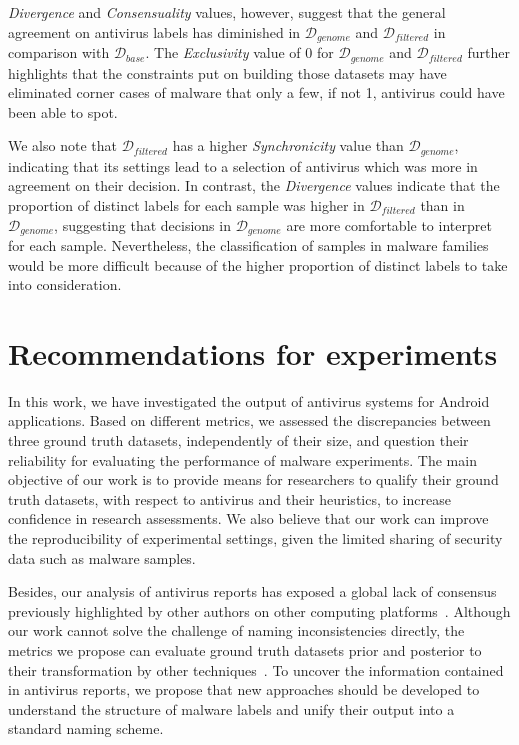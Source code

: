 \emph{Divergence} and \emph{Consensuality} values, however, suggest that the general agreement on antivirus labels has diminished in $\mathcal{D}_{genome}$ and $\mathcal{D}_{filtered}$ in comparison with $\mathcal{D}_{base}$.
The \emph{Exclusivity} value of 0 for $\mathcal{D}_{genome}$ and $\mathcal{D}_{filtered}$ further highlights that the constraints put on building those datasets may have eliminated corner cases of malware that only a few, if not 1, antivirus could have been able to spot.

We also note that $\mathcal{D}_{filtered}$ has a higher \emph{Synchronicity} value than $\mathcal{D}_{genome}$, indicating that its settings lead to a selection of antivirus which was more in agreement on their decision.
In contrast, the \emph{Divergence} values indicate that the proportion of distinct labels for each sample was higher in $\mathcal{D}_{filtered}$ than in $\mathcal{D}_{genome}$, suggesting that decisions in $\mathcal{D}_{genome}$ are more comfortable to interpret for each sample.
Nevertheless, the classification of samples in malware families would be more difficult because of the higher proportion of distinct labels to take into consideration.
\section{Recommendations for experiments}
In this work, we have investigated the output of antivirus systems for Android applications.
Based on different metrics, we assessed the discrepancies between three ground truth datasets, independently of their size, and question their reliability for evaluating the performance of malware experiments.
The main objective of our work is to provide means for researchers to qualify their ground truth datasets, with respect to antivirus and their heuristics, to increase confidence in research assessments.
We also believe that our work can improve the reproducibility of experimental settings, given the limited sharing of security data such as malware samples.

Besides, our analysis of antivirus reports has exposed a global lack of consensus previously highlighted by other authors on other computing platforms~\cite{kruegel_automated_2007, bureau_dose_2008, harley_game_2009, jajodia_finding_2011}.
Although our work cannot solve the challenge of naming inconsistencies directly, the metrics we propose can evaluate ground truth datasets prior and posterior to their transformation by other techniques~\cite{perdisci_vamo:_2012, wang_rebuilding_2014, kantchelian_better_2015}.
To uncover the information contained in antivirus reports, we propose that new approaches should be developed to understand the structure of malware labels and unify their output into a standard naming scheme.
